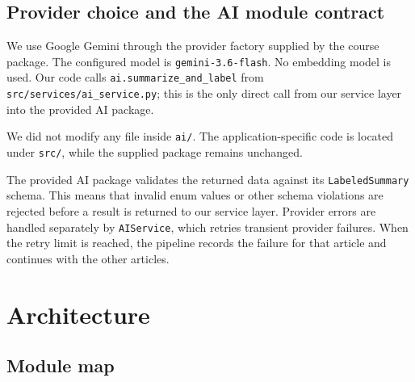 \documentclass[11pt,a4paper]{article}
\begin{document}
\subsection{Provider choice and the AI module contract}


We use Google Gemini through the provider factory supplied by the course package. The configured model is \texttt{gemini-3.6-flash}. No embedding model is used. Our code calls \texttt{ai.summarize\_and\_label} from \texttt{src/services/ai\_service.py}; this is the only direct call from our service layer into the provided AI package.

We did not modify any file inside \texttt{ai/}. The application-specific code is located under \texttt{src/}, while the supplied package remains unchanged.

The provided AI package validates the returned data against its \texttt{LabeledSummary} schema. This means that invalid enum values or other schema violations are rejected before a result is returned to our service layer. Provider errors are handled separately by \texttt{AIService}, which retries transient provider failures. When the retry limit is reached, the pipeline records the failure for that article and continues with the other articles.

\section{Architecture}\label{sec:arch}

\subsection{Module map}
\end{document}
